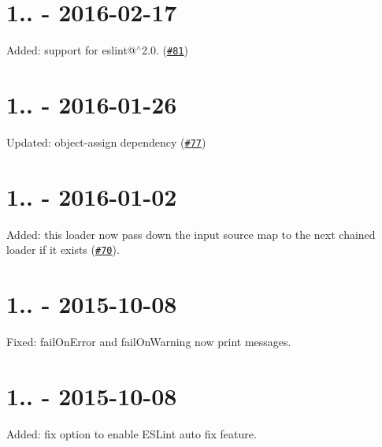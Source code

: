\section*{1.. -\/ 2016-\/02-\/17}


\begin{DoxyItemize}
\item Added\+: support for eslint@$^\wedge$2.0. (\href{https://github.com/MoOx/eslint-loader/pull/81}{\tt \#81})
\end{DoxyItemize}

\section*{1.. -\/ 2016-\/01-\/26}


\begin{DoxyItemize}
\item Updated\+: object-\/assign dependency (\href{https://github.com/MoOx/eslint-loader/pull/77}{\tt \#77})
\end{DoxyItemize}

\section*{1.. -\/ 2016-\/01-\/02}


\begin{DoxyItemize}
\item Added\+: this loader now pass down the input source map to the next chained loader if it exists (\href{https://github.com/MoOx/eslint-loader/pull/70}{\tt \#70}).
\end{DoxyItemize}

\section*{1.. -\/ 2015-\/10-\/08}


\begin{DoxyItemize}
\item Fixed\+: {\ttfamily fail\+On\+Error} and {\ttfamily fail\+On\+Warning} now print messages.
\end{DoxyItemize}

\section*{1.. -\/ 2015-\/10-\/08}


\begin{DoxyItemize}
\item Added\+: {\ttfamily fix} option to enable E\+S\+Lint auto fix feature.
\end{DoxyItemize}

